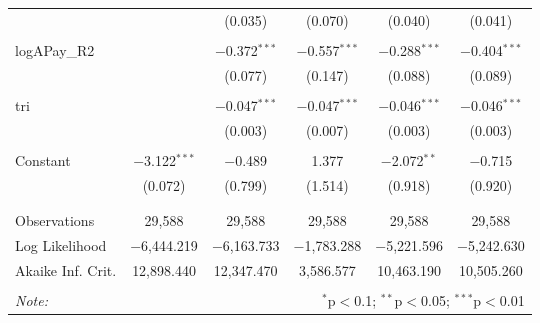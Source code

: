 \begin{table}[!htbp]
\begin{tabular}{@{\extracolsep{5pt}}lccccc}
  &  & (0.035) & (0.070) & (0.040) & (0.041) \\ 
  & & & & & \\ 
 logAPay\_R2 &  & $-$0.372$^{***}$ & $-$0.557$^{***}$ & $-$0.288$^{***}$ & $-$0.404$^{***}$ \\ 
  &  & (0.077) & (0.147) & (0.088) & (0.089) \\ 
  & & & & & \\ 
 tri &  & $-$0.047$^{***}$ & $-$0.047$^{***}$ & $-$0.046$^{***}$ & $-$0.046$^{***}$ \\ 
  &  & (0.003) & (0.007) & (0.003) & (0.003) \\ 
  & & & & & \\ 
 Constant & $-$3.122$^{***}$ & $-$0.489 & 1.377 & $-$2.072$^{**}$ & $-$0.715 \\ 
  & (0.072) & (0.799) & (1.514) & (0.918) & (0.920) \\ 
  & & & & & \\ 
\hline \\[-1.8ex] 
Observations & 29,588 & 29,588 & 29,588 & 29,588 & 29,588 \\ 
Log Likelihood & $-$6,444.219 & $-$6,163.733 & $-$1,783.288 & $-$5,221.596 & $-$5,242.630 \\ 
Akaike Inf. Crit. & 12,898.440 & 12,347.470 & 3,586.577 & 10,463.190 & 10,505.260 \\ 
\hline 
\hline \\[-1.8ex] 
\textit{Note:}  & \multicolumn{5}{r}{$^{*}$p$<$0.1; $^{**}$p$<$0.05; $^{***}$p$<$0.01} \\ 
\end{tabular} 
\end{table} 
